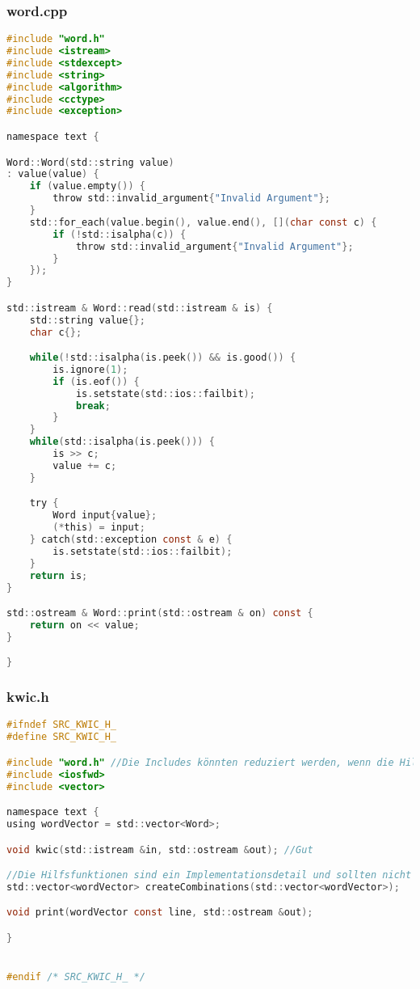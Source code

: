 \subsubsection{word.cpp}
\begin{lstlisting}[style=frame, style= linenumbers, language=C]
#include "word.h"
#include <istream>
#include <stdexcept>
#include <string>
#include <algorithm>
#include <cctype>
#include <exception>

namespace text {

Word::Word(std::string value)
: value(value) {
	if (value.empty()) {
		throw std::invalid_argument{"Invalid Argument"};
	}
	std::for_each(value.begin(), value.end(), [](char const c) {
		if (!std::isalpha(c)) {
			throw std::invalid_argument{"Invalid Argument"};
		}
	});
}

std::istream & Word::read(std::istream & is) {
    std::string value{};
    char c{};

    while(!std::isalpha(is.peek()) && is.good()) {
    	is.ignore(1);
    	if (is.eof()) {
    		is.setstate(std::ios::failbit);
    		break;
    	}
    }
    while(std::isalpha(is.peek())) {
    	is >> c;
    	value += c;
    }

    try {
        Word input{value};
        (*this) = input;
    } catch(std::exception const & e) {
        is.setstate(std::ios::failbit);
    }
    return is;
}

std::ostream & Word::print(std::ostream & on) const {
    return on << value;
}

}
\end{lstlisting}

\subsubsection{kwic.h}
\begin{lstlisting}[style=frame, style= linenumbers, language=C]
#ifndef SRC_KWIC_H_
#define SRC_KWIC_H_

#include "word.h" //Die Includes könnten reduziert werden, wenn die Hilfsfunktionen hier nicht deklariert wären
#include <iosfwd>
#include <vector>

namespace text {
using wordVector = std::vector<Word>;

void kwic(std::istream &in, std::ostream &out); //Gut

//Die Hilfsfunktionen sind ein Implementationsdetail und sollten nicht im Header deklariert werden (sofern nicht getestet)
std::vector<wordVector> createCombinations(std::vector<wordVector>);

void print(wordVector const line, std::ostream &out);

}


#endif /* SRC_KWIC_H_ */
\end{lstlisting}
